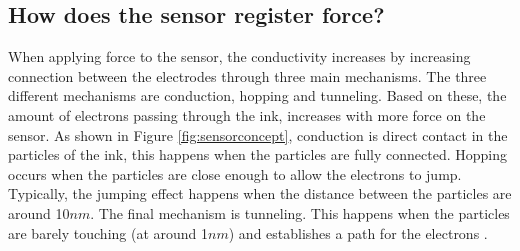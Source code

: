 \subsection{How does the sensor register force?}
When applying force to the sensor, the conductivity increases by increasing connection between the electrodes through three main mechanisms.
The three different mechanisms are conduction, hopping and tunneling.
Based on these, the amount of electrons passing through the ink, increases with more force on the sensor. As shown in Figure \ref{fig:sensorconcept}, conduction is direct contact in the particles of the ink, this happens when the particles are fully connected. Hopping occurs when the particles are close enough to allow the electrons to jump. Typically, the jumping effect happens when the distance between the particles are around 10$nm$. The final mechanism is tunneling. This happens when the particles are barely touching (at around 1$nm$) and establishes a path for the electrons \citep[10.3, p.418]{handbook}.

